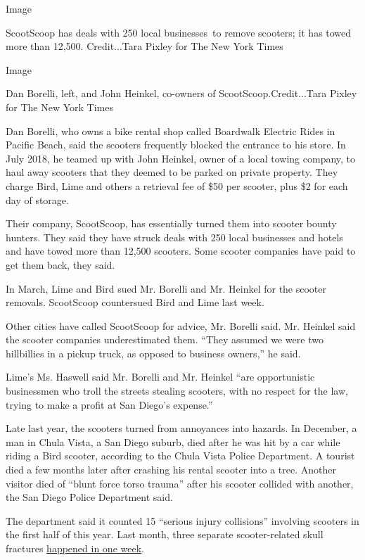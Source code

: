 Image

ScootScoop has deals with 250 local businesses~to remove scooters; it
has towed more than 12,500. Credit...Tara Pixley for The New York Times

Image

Dan Borelli, left, and John Heinkel, co-owners of
ScootScoop.Credit...Tara Pixley for The New York Times

Dan Borelli, who owns a bike rental shop called Boardwalk Electric Rides
in Pacific Beach, said the scooters frequently blocked the entrance to
his store. In July 2018, he teamed up with John Heinkel, owner of a
local towing company, to haul away scooters that they deemed to be
parked on private property. They charge Bird, Lime and others a
retrieval fee of \$50 per scooter, plus \$2 for each day of storage.

Their company, ScootScoop, has essentially turned them into scooter
bounty hunters. They said they have struck deals with 250 local
businesses and hotels and have towed more than 12,500 scooters. Some
scooter companies have paid to get them back, they said.

In March, Lime and Bird sued Mr. Borelli and Mr. Heinkel for the scooter
removals. ScootScoop countersued Bird and Lime last week.

Other cities have called ScootScoop for advice, Mr. Borelli said. Mr.
Heinkel said the scooter companies underestimated them. ``They assumed
we were two hillbillies in a pickup truck, as opposed to business
owners,'' he said.

Lime's Ms. Haswell said Mr. Borelli and Mr. Heinkel ``are opportunistic
businessmen who troll the streets stealing scooters, with no respect for
the law, trying to make a profit at San Diego's expense.''

Late last year, the scooters turned from annoyances into hazards. In
December, a man in Chula Vista, a San Diego suburb, died after he was
hit by a car while riding a Bird scooter, according to the Chula Vista
Police Department. A tourist died a few months later after crashing his
rental scooter into a tree. Another visitor died of ``blunt force torso
trauma'' after his scooter collided with another, the San Diego Police
Department said.

The department said it counted 15 ``serious injury collisions''
involving scooters in the first half of this year. Last month, three
separate scooter-related skull fractures
\href{https://fox5sandiego.com/2019/08/06/third-person-fractures-skull-from-scooter-crash-this-week/}{happened
in one week}.

